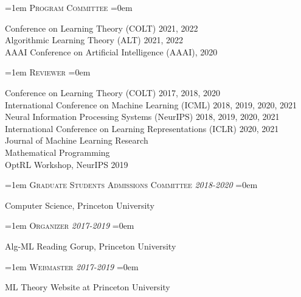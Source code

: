\documentclass{scrartcl}
\newcommand{\NewEntry}[3]{\noindent\hangindent=1em\hangafter=0 #2 \hfill \textit{#1}  #3 
\vspace{0.5em}}
\newcommand{\Description}[1]{\hangindent=0em\hangafter=0\noindent\raggedright {#1}\par\normalsize\vspace{1em}}
\newcommand{\spacedlowallcaps}[1]{{\Large\textls[80]{\scshape \MakeTextLowercase{#1}}}}
\begin{document}
\begin{cv}{}
\vspace{0.5em}

\noindent\spacedlowallcaps{Service}

\hspace{0.5em}

\NewEntry{}{\textsc{\color{Maroon} Program Committee}}

\vspace{-0.2em}\hspace{0.8em}
\Description{Conference on Learning Theory (COLT) 2021, 2022\\
\hspace{1em}Algorithmic Learning Theory (ALT) 2021, 2022\\
\hspace{1em}AAAI Conference on Artificial Intelligence (AAAI), 2020 }

\NewEntry{}{\textsc{\color{Maroon} Reviewer}}

\vspace{-0.2em}\hspace{0.8em}
\Description{Conference on Learning Theory (COLT) 2017, 2018, 2020 \\
\hspace{1em}International Conference on Machine Learning (ICML) 2018, 2019, 2020, 2021\\
\hspace{1em}Neural Information Processing Systems (NeurIPS) 2018, 2019, 2020, 2021\\
\hspace{1em}International Conference on Learning Representations (ICLR) 2020, 2021\\
\hspace{1em}Journal of Machine Learning Research\\
\hspace{1em}Mathematical Programming\\
\hspace{1em}OptRL Workshop, NeurIPS 2019
}

\NewEntry{2018-2020}{\textsc{\color{Maroon} Graduate Students Admissions Committee}}

\vspace{-0.2em}\hspace{0.8em}
\Description{Computer Science, Princeton University}

\NewEntry{2017-2019}{\textsc{\color{Maroon} Organizer}}

\vspace{-0.2em}\hspace{0.8em}
\Description{Alg-ML Reading Gorup, Princeton University}

\NewEntry{2017-2019}{\textsc{\color{Maroon} Webmaster}}

\vspace{-0.2em}\hspace{0.8em}
\Description{ML Theory Website at Princeton University}


\end{cv}
\end{document}
